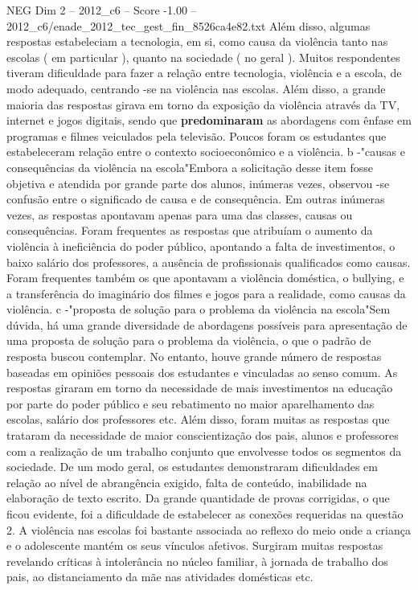 \begin{textsample}{NEG Dim 2 – 2012\_c6 – Score -1.00 – 2012\_c6/enade\_2012\_tec\_gest\_fin\_8526ca4e82.txt}
Além disso, algumas respostas estabeleciam a tecnologia, em si, como causa da violência tanto nas escolas ( em particular ), quanto na sociedade ( no geral ).
Muitos respondentes tiveram dificuldade para fazer a relação entre tecnologia, violência e a escola, de modo adequado, centrando -se na violência nas escolas.
Além disso, a grande maioria das respostas girava em torno da exposição da violência através da TV, internet e jogos digitais, sendo que \textbf{predominaram} as abordagens com ênfase em programas e filmes veiculados pela televisão.
Poucos foram os estudantes que estabeleceram relação entre o contexto socioeconômico e a violência. b -"causas e consequências da violência na escola"Embora a solicitação desse item fosse objetiva e atendida por grande parte dos alunos, inúmeras vezes, observou -se confusão entre o significado de causa e de consequência.
Em outras inúmeras vezes, as respostas apontavam apenas para uma das classes, causas ou consequências.
Foram frequentes as respostas que atribuíam o aumento da violência à ineficiência do poder público, apontando a falta de investimentos, o baixo salário dos professores, a ausência de profissionais qualificados como causas.
Foram frequentes também os que apontavam a violência doméstica, o bullying, e a transferência do imaginário dos filmes e jogos para a realidade, como causas da violência. c -"proposta de solução para o problema da violência na escola"Sem dúvida, há uma grande diversidade de abordagens possíveis para apresentação de uma proposta de solução para o problema da violência, o que o padrão de resposta buscou contemplar.
No entanto, houve grande número de respostas baseadas em opiniões pessoais dos estudantes e vinculadas ao senso comum.
As respostas giraram em torno da necessidade de mais investimentos na educação por parte do poder público e seu rebatimento no maior aparelhamento das escolas, salário dos professores etc.
Além disso, foram muitas as respostas que trataram da necessidade de maior conscientização dos pais, alunos e professores com a realização de um trabalho conjunto que envolvesse todos os segmentos da sociedade.
De um modo geral, os estudantes demonstraram dificuldades em relação ao nível de abrangência exigido, falta de conteúdo, inabilidade na elaboração de texto escrito.
Da grande quantidade de provas corrigidas, o que ficou evidente, foi a dificuldade de estabelecer as conexões requeridas na questão 2.
A violência nas escolas foi bastante associada ao reflexo do meio onde a criança e o adolescente mantém os seus vínculos afetivos.
Surgiram muitas respostas revelando críticas à intolerância no núcleo familiar, à jornada de trabalho dos pais, ao distanciamento da mãe nas atividades domésticas etc.

\end{textsample}
